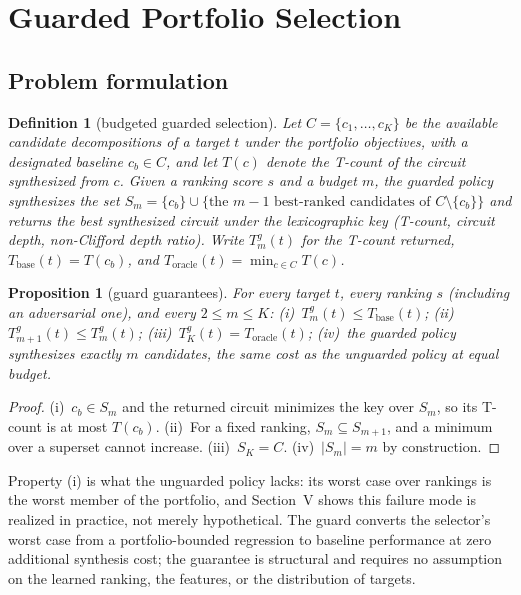 \documentclass{cbctq}
\newtheorem{definition}{Definition}
\newtheorem{proposition}{Proposition}
\begin{document}
\section{Guarded Portfolio Selection}

\subsection{Problem formulation}

\begin{definition}[budgeted guarded selection]\label{def:guarded}
Let $C=\{c_1,\dots,c_K\}$ be the available candidate decompositions of a target $t$ under the portfolio objectives, with a designated baseline $c_b\in C$, and let $T(c)$ denote the T-count of the circuit synthesized from $c$. Given a ranking score $s$ and a budget $m$, the \emph{guarded policy} synthesizes the set
$S_m = \{c_b\}\cup\{\text{the } m-1 \text{ best-ranked candidates of } C\setminus\{c_b\}\}$
and returns the best synthesized circuit under the lexicographic key (T-count, circuit depth, non-Clifford depth ratio). Write $T^{g}_m(t)$ for the T-count returned, $T_{\mathrm{base}}(t)=T(c_b)$, and $T_{\mathrm{oracle}}(t)=\min_{c\in C}T(c)$.
\end{definition}

\begin{proposition}[guard guarantees]\label{prop:guard}
For every target $t$, every ranking $s$ (including an adversarial one), and every $2\le m\le K$:
(i)~$T^{g}_m(t)\le T_{\mathrm{base}}(t)$;
(ii)~$T^{g}_{m+1}(t)\le T^{g}_m(t)$;
(iii)~$T^{g}_K(t)=T_{\mathrm{oracle}}(t)$;
(iv)~the guarded policy synthesizes exactly $m$ candidates, the same cost as the unguarded policy at equal budget.
\end{proposition}

\begin{proof}
(i)~$c_b\in S_m$ and the returned circuit minimizes the key over $S_m$, so its T-count is at most $T(c_b)$. (ii)~For a fixed ranking, $S_m\subseteq S_{m+1}$, and a minimum over a superset cannot increase. (iii)~$S_K=C$. (iv)~$|S_m|=m$ by construction.
\end{proof}

Property (i) is what the unguarded policy lacks: its worst case over rankings is the worst member of the portfolio, and Section~V shows this failure mode is realized in practice, not merely hypothetical. The guard converts the selector's worst case from a portfolio-bounded regression to baseline performance at zero additional synthesis cost; the guarantee is structural and requires no assumption on the learned ranking, the features, or the distribution of targets.
\end{document}
